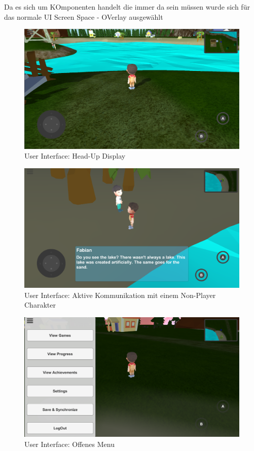 		Da es sich um KOmponenten handelt die immer da sein müssen wurde sich für das normale UI Screen Space - OVerlay ausgewählt
		
		\begin{figure}[htbp]
			\centering 
			\label{umlControl}
			\includegraphics[width=13cm]{pics/alwaysOnUI.png}
			\caption{User Interface: Head-Up Display}
		\end{figure}
	
		\begin{figure}[htbp]
			\centering 
			\label{umlControl}
			\includegraphics[width=13cm]{pics/communicationUI.png}
			\caption{User Interface: Aktive Kommunikation mit einem Non-Player Charakter}
		\end{figure}

		\begin{figure}[htbp]
			\centering 
			\label{umlControl}
			\includegraphics[width=13cm]{pics/menuUI.png}
			\caption{User Interface: Offenes Menu}
		\end{figure}
		
